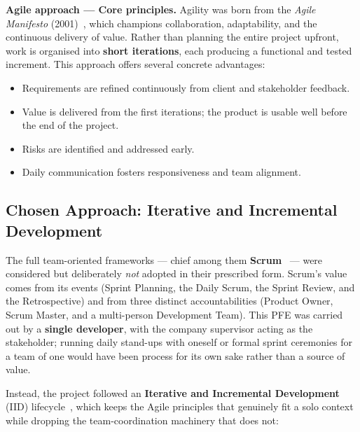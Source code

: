 \documentclass[12pt, a4paper, oneside]{report}
\begin{document}
\medskip
\noindent\textbf{Agile approach --- Core principles.}
Agility was born from the \textit{Agile Manifesto}
(2001)~\cite{agilemanifesto}, which
champions collaboration, adaptability, and the continuous delivery of
value. Rather than planning the entire project upfront, work is
organised into \textbf{short iterations}, each producing a functional
and tested increment. This
approach offers several concrete advantages:

\begin{itemize}[leftmargin=*,itemsep=2pt]
  \item Requirements are refined continuously from client and
        stakeholder feedback.
  \item Value is delivered from the first iterations; the product is
        usable well before the end of the project.
  \item Risks are identified and addressed early.
  \item Daily communication fosters responsiveness and team alignment.
\end{itemize}

\subsection{Chosen Approach: Iterative and Incremental Development}

The full team-oriented frameworks --- chief among them
\textbf{Scrum}~\cite{scrumguide} --- were considered but deliberately
\emph{not} adopted in their prescribed form. Scrum's value comes from
its events (Sprint Planning, the Daily Scrum, the Sprint Review, and
the Retrospective) and from three distinct accountabilities (Product
Owner, Scrum Master, and a multi-person Development Team). This PFE was
carried out by a \textbf{single developer}, with the company supervisor
acting as the stakeholder; running daily stand-ups with oneself or
formal sprint ceremonies for a team of one would have been process for
its own sake rather than a source of value.

Instead, the project followed an \textbf{Iterative and Incremental
Development} (IID) lifecycle~\cite{iid}, which keeps the Agile
principles that genuinely fit a solo context while dropping the
team-coordination machinery that does not:
\end{document}
